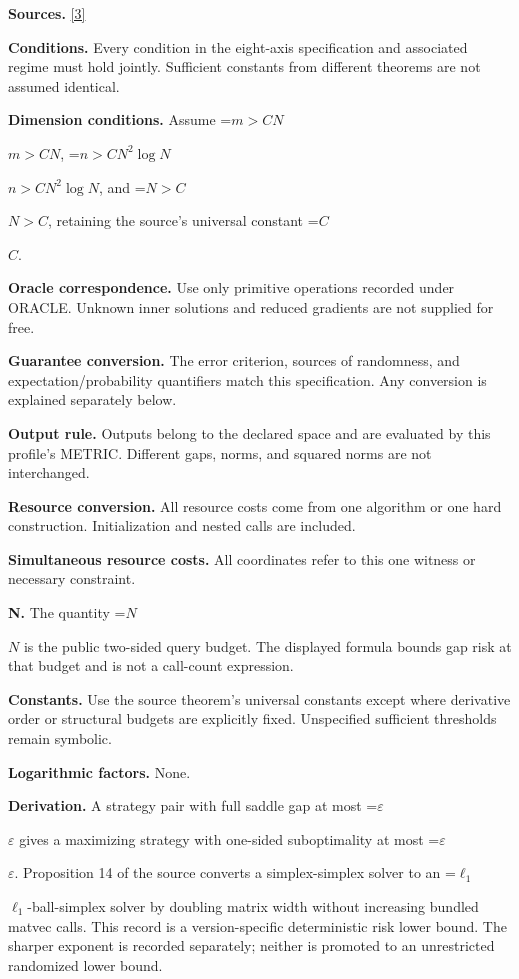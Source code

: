 \documentclass[10pt,a4paper]{article}
\newcommand{\AtlasMath}[1]{\par\begingroup\centering\setbox0=\hbox{$\displaystyle #1$}\ifdim\wd0>1.4\linewidth\typeout{ATLAS WIDE FORMULA: \the\wd0}\fi\ifdim\wd0>\linewidth\resizebox{\linewidth}{!}{\box0}\else\box0\fi\par\endgroup}
\newcommand{\AtlasInlineMath}[1]{\begingroup\setbox0=\hbox{$#1$}\ifdim\wd0>.4\linewidth\endgroup\AtlasMath{#1}\else\endgroup$#1$\fi}
\begin{document}
\textbf{Sources.} \href{https://raw.githubusercontent.com/mlresearch/v291/main/assets/kornowski25a/kornowski25a.pdf}{[3]}



\textbf{Conditions.} Every condition in the eight-axis specification and associated regime must hold jointly. Sufficient constants from different theorems are not assumed identical.



\textbf{Dimension conditions.} Assume \AtlasInlineMath{m>CN}, \AtlasInlineMath{n>CN^2\log N}, and \AtlasInlineMath{N>C}, retaining the source's universal constant \AtlasInlineMath{C}.



\textbf{Oracle correspondence.} Use only primitive operations recorded under ORACLE. Unknown inner solutions and reduced gradients are not supplied for free.



\textbf{Guarantee conversion.} The error criterion, sources of randomness, and expectation/probability quantifiers match this specification. Any conversion is explained separately below.



\textbf{Output rule.} Outputs belong to the declared space and are evaluated by this profile's METRIC. Different gaps, norms, and squared norms are not interchanged.



\textbf{Resource conversion.} All resource costs come from one algorithm or one hard construction. Initialization and nested calls are included.



\textbf{Simultaneous resource costs.} All coordinates refer to this one witness or necessary constraint.



\textbf{N.} The quantity \AtlasInlineMath{N} is the public two-sided query budget. The displayed formula bounds gap risk at that budget and is not a call-count expression.



\textbf{Constants.} Use the source theorem’s universal constants except where derivative order or structural budgets are explicitly fixed. Unspecified sufficient thresholds remain symbolic.



\textbf{Logarithmic factors.} None.



\textbf{Derivation.} A strategy pair with full saddle gap at most \AtlasInlineMath{\varepsilon} gives a maximizing strategy with one-sided suboptimality at most \AtlasInlineMath{\varepsilon}. Proposition 14 of the source converts a simplex-simplex solver to an \AtlasInlineMath{\ell_1}-ball-simplex solver by doubling matrix width without increasing bundled matvec calls. This record is a version-specific deterministic risk lower bound. The sharper exponent is recorded separately; neither is promoted to an unrestricted randomized lower bound.
\end{document}
